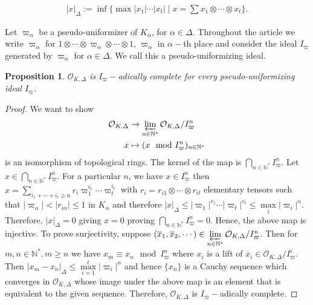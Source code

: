 \documentclass[12pts,a4paper]{amsart}
\newtheorem{proposition}{Proposition}[section]
\begin{document}
\begin{align*}
	|x|_\Delta:=\inf\bigl\{\max |x_1|\cdots|x_t| \mid x=\sum x_1\otimes\cdots\otimes x_t\bigr\}.
\end{align*}

Let $\varpi_\alpha$ be a pseudo-uniformizer of $K_\alpha$, for $\alpha\in\Delta$. Throughout the article we write $\varpi_\alpha$ for $1\otimes\cdots\otimes\varpi_\alpha\otimes\cdots\otimes 1$, $\varpi_\alpha$ in $\alpha-$th place and consider the ideal $I_\varpi$ generated by $\varpi_\alpha$ for $\alpha\in \Delta$.  We call this a pseudo-uniformizing ideal. 

\begin{proposition}
	$\mathcal{O}_{K,\Delta}$ is $I_\varpi-$adically complete for every pseudo-uniformizing ideal $I_\varpi$.
\end{proposition}

\begin{proof}
     We want to show
     \begin{align*}
     	 \mathcal{O}_{K,\Delta}&\to \varprojlim\limits_{n\in\mathbb{N}^*}\mathcal{O}_{K,\Delta}/I^n_{\varpi}\\
     	                                 x     &\mapsto (x\mod I^n_\varpi)_{n\in\mathbb{N}^*}
     \end{align*}
     is an isomorphism of topological rings. The kernel of the map is $\bigcap\limits_{n\in\mathbb{N}^*}I^n_{\varpi}$. Let $x\in\bigcap\limits_{n\in\mathbb{N}^*}I^n_\varpi$. For a particular $n$, we have $x\in I^n_\varpi$ then $x=\sum\limits_{i_1+\cdots+i_t\geq n}r_i \varpi_1^{i_1}\cdots\varpi^{i_t}_t$ with $r_i=r_{i1}\otimes\cdots\otimes r_{it}$ elementary tensors such that $|\varpi_\alpha|<|r_{i\alpha}|\leq 1$ in $K_\alpha$ and therefore $|x|_\Delta\leq |\varpi_1|^{r_1}\cdots |\varpi_t|^{r_t}\leq \max\limits_i|\varpi_i|^n$. Therefore, $|x|_\Delta=0$ giving $x=0$ proving $\bigcap\limits_{n\in\mathbb{N}^*}I^n_\varpi=0$. Hence, the above map is injective. To prove surjectivity, suppose $(\overline{x}_1,\overline{x}_2,\cdots)\in\varprojlim\limits_{n\in\mathbb{N}^*}\mathcal{O}_{K,\Delta}/I^n_\varpi$. Then for $m,n\in\mathbb{N}^*, m\geq n$ we have $x_m\equiv x_n\mod I^n_\varpi$ where $x_i$ is a lift of $\overline{x}_i\in\mathcal{O}_{K,\Delta}/I^i_\varpi$. Then $|x_m-x_n|_\Delta\leq \max\limits^t_{i=1}|\varpi_i|^n$ and hence $\{x_n\}$ is a Cauchy sequence which converges in $\mathcal{O}_{K,\Delta}$ whose image under the above map is an element that is equivalent to the given sequence. Therefore, $\mathcal{O}_{K,\Delta}$ is $I_\varpi-$adically complete.
\end{proof}
\end{document}
